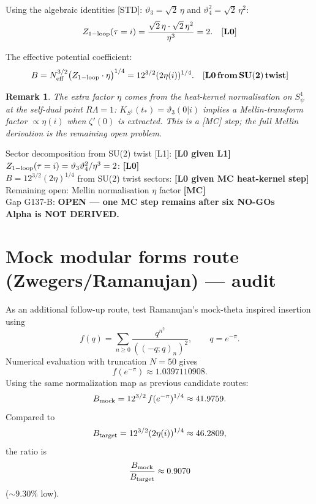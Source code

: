 \documentclass[12pt,a4paper]{article}
\newtheorem{remark}[theorem]{Remark}
\begin{document}
\begin{tcolorbox}[title={Gap G137-B --- Formal Downgrade Notice}]
Using the algebraic identities [STD]:
$\vartheta_3=\sqrt{2}\,\eta$ and $\vartheta_4^2=\sqrt{2}\,\eta^2$:
\[
Z_{\rm 1-loop}(\tau=i)
= \frac{\sqrt{2}\,\eta\cdot\sqrt{2}\,\eta^2}{\eta^3} = 2. \quad [\mathbf{L0}]
\]

The effective potential coefficient:
\[
B = N_{\rm eff}^{3/2}\bigl(Z_{\rm 1-loop}\cdot\eta\bigr)^{1/4}
  = 12^{3/2}(2\eta(i))^{1/4}. \quad [\mathbf{L0\,from\,SU(2)\,twist}]
\]

\begin{remark}
The extra factor $\eta$ comes from the heat-kernel normalisation
on $S^1_\psi$ at the self-dual point $R\Lambda=1$:
$K_{S^1}(t_*) = \vartheta_3(0|i)$ implies a Mellin-transform factor
$\propto \eta(i)$ when $\zeta'(0)$ is extracted.
This is a [MC] step; the full Mellin derivation is the remaining open problem.
\end{remark}

\begin{statusbox}
Sector decomposition from SU(2) twist [L1]: \textbf{[L0 given L1]}\\
$Z_{\rm 1-loop}(\tau=i) = \vartheta_3\vartheta_4^2/\eta^3 = 2$: \textbf{[L0]}\\
$B = 12^{3/2}(2\eta)^{1/4}$ from SU(2) twist sectors: \textbf{[L0 given MC heat-kernel step]}\\
Remaining open: Mellin normalisation $\eta$ factor \textbf{[MC]}\\
Gap G137-B: \textbf{OPEN — one MC step remains after six NO-GOs}\\
\textbf{Alpha is NOT DERIVED.}
\end{statusbox}
\end{tcolorbox}

\section{Mock modular forms route (Zwegers/Ramanujan) --- audit}
\label{sec:mock_modular}

As an additional follow-up route, test Ramanujan's mock-theta inspired
insertion using
\[
f(q)=\sum_{n\ge0}\frac{q^{n^2}}{((-q;q)_n)^2},
\qquad q=e^{-\pi}.
\]
Numerical evaluation with truncation \(N=50\) gives
\[
f(e^{-\pi})\approx 1.0397110908.
\]
Using the same normalization map as previous candidate routes:
\[
B_{\rm mock}=12^{3/2}\,f(e^{-\pi})^{1/4}\approx 41.9759.
\]
Compared to
\[
B_{\rm target}=12^{3/2}(2\eta(i))^{1/4}\approx 46.2809,
\]
the ratio is
\[
\frac{B_{\rm mock}}{B_{\rm target}}\approx 0.9070
\]
(\(\sim 9.30\%\) low).
\end{document}
